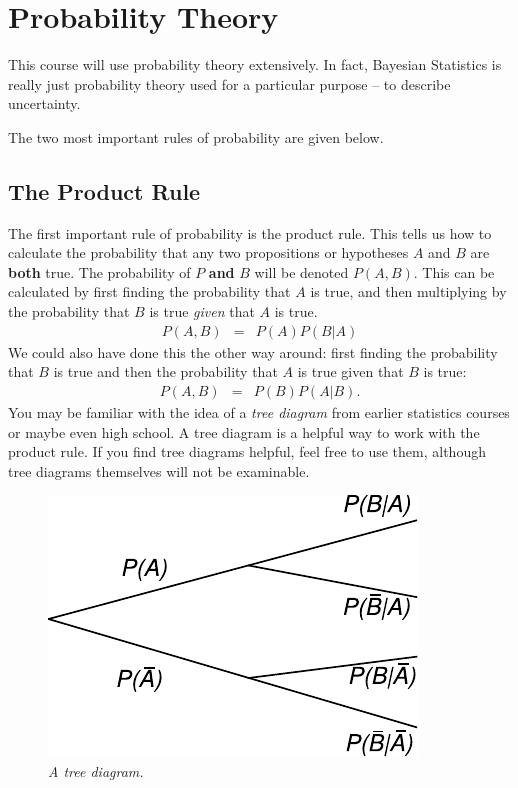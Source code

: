 \chapter{Probability Theory}
This course will use probability theory extensively. In fact, Bayesian
Statistics is really just probability theory used for a particular purpose --
to describe uncertainty.

The two most important rules of probability are given below.

\section{The Product Rule}
The first important rule of probability is the
product rule. This tells us how to calculate the probability that any two
propositions or hypotheses $A$ and $B$ are {\bf both} true.
The probability of $P$ {\bf and}
$B$ will be denoted $P(A, B)$. This can be calculated by first finding the
probability that $A$ is true, and then multiplying by the probability that $B$
is true {\it given} that $A$ is true.
\begin{eqnarray}
P(A, B) &=& P(A)P(B|A)\label{product1}
\end{eqnarray}
We could also have done this the other way around: first finding the
probability that $B$ is true and then the probability that $A$ is true given
that $B$ is true:
\begin{eqnarray}
P(A, B) &=& P(B)P(A|B).\label{product2}
\end{eqnarray}
You may be familiar with the idea of a {\it tree diagram} from earlier
statistics courses or maybe even high school. A tree diagram is a helpful way
to work with the product rule. If you find tree diagrams helpful, feel free to
use them, although tree diagrams themselves will not be examinable.

\begin{figure}[ht!]
\begin{center}
\includegraphics[scale=0.9]{Figures/tree_diagram.pdf}
\caption{\it A tree diagram.}
\end{center}
\end{figure}

